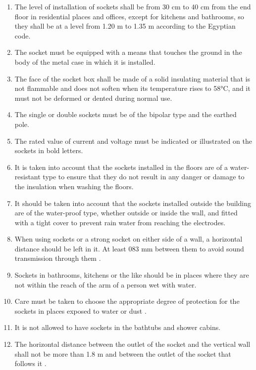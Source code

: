 \documentclass[12pt,fleqn]{book} %
\begin{document}
\begin{enumerate}
    \item  The level of installation of sockets shall be from 30 cm to 40 cm from the end floor in residential places and offices, except for kitchens and bathrooms, so they shall be at a level from 1.20 m to 1.35 m according to the Egyptian code.
    \item The socket must be equipped with a means that touches the ground in the     body of the metal case in which it is installed.
    \item The face of the socket box shall be made of a solid insulating material that is not flammable and does not soften when its temperature rises to 58°C, and it must not be deformed or dented during normal use.
    \item The single or double sockets must be of the bipolar type and the earthed pole. 
    \item The rated value of current and voltage must be indicated or illustrated on the sockets in bold letters.
    \item It is taken into account that the sockets installed in the floors are of a water-resistant type to ensure that they do not result in any danger or damage to the insulation when washing the floors.
    \item It should be taken into account that the sockets installed outside the building are of the water-proof type, whether outside or inside the wall, and fitted with a tight cover to prevent rain water from reaching the electrodes. 
    \item When using sockets or a strong socket on either side of a wall, a horizontal distance should be left in it. At least 083 mm between them to avoid sound transmission through them .
    \item Sockets in bathrooms, kitchens or the like should be in places where they are not within the reach of the arm of a person wet with water. 
    \item  Care must be taken to choose the appropriate degree of protection for the sockets in places exposed to water or dust .
    \item It is not allowed to have sockets in the bathtubs and shower cabins.
    \item The horizontal distance between the outlet of the socket and the vertical wall shall not be more than 1.8 m and between the outlet of the socket that follows it .
\end{enumerate}
\end{document}
